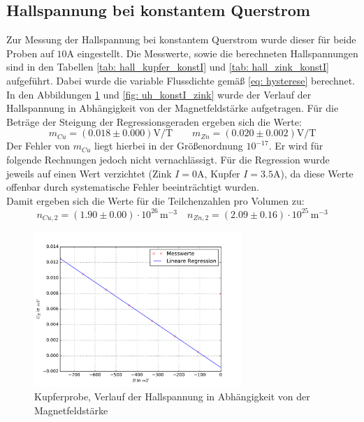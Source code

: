 \subsection{Hallspannung bei konstantem Querstrom}
Zur Messung der Hallspannung bei konstantem Querstrom wurde dieser für beide Proben auf $10\si{\ampere}$ eingestellt. Die
Messwerte, sowie die berechneten Hallspannungen sind in den Tabellen \ref{tab: hall_kupfer_konstI} und \ref{tab: hall_zink_konstI} aufgeführt. Dabei wurde
die variable Flussdichte gemäß \eqref{eq: hysterese} berechnet. In den Abbildungen \ref{fig: uh_konstI_kupfer} und \ref{fig: uh_konstI_zink}
wurde der Verlauf der Hallspannung in Abhängigkeit von der Magnetfeldstärke aufgetragen. Für die Beträge der Steigung der Regressionsgeraden
ergeben sich die Werte:
\begin{equation}
  m_{Cu} = (0.018 \pm 0.000)\si{\volt \per \tesla }  \quad \quad m_{Zn} = (0.020 \pm 0.002)\si{\volt \per \tesla}
\end{equation}
Der Fehler von $m_{Cu}$ liegt hierbei in der Größenordnung $10^{-17}$. Er wird für folgende Rechnungen jedoch nicht vernachlässigt.
Für die Regression wurde jeweils auf einen Wert verzichtet (Zink $I = 0 \si{\ampere}$, Kupfer $I = 3.5\si{\ampere}$), da diese Werte offenbar
durch systematische Fehler beeinträchtigt wurden.\\
Damit ergeben sich die Werte für die Teilchenzahlen pro Volumen zu:
\begin{equation}
  n_{Cu,2} = (1.90 \pm 0.00)\cdot 10^{26}\,\si{ \meter^{-3}} \quad n_{Zn,2} = (2.09\pm 0.16)\cdot 10^{25}\,\si{ \meter^{-3}}
\end{equation}


\begin{figure}
  \centering
  \includegraphics[width=0.7\textwidth]{pics/u_h_kupfer_konstI.pdf}
  \caption{Kupferprobe, Verlauf der Hallspannung in Abhängigkeit von der Magnetfeldstärke}
  \label{fig: uh_konstI_kupfer}
\end{figure}
